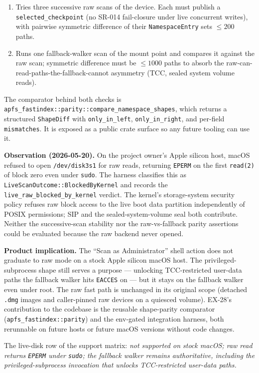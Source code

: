 \begin{enumerate}
  \item Tries three successive raw scans of the device. Each
    must publish a \texttt{selected\_checkpoint} (no SR-014
    fail-closure under live concurrent writes), with pairwise
    symmetric difference of their \texttt{NamespaceEntry} sets
    $\leq 200$ paths.
  \item Runs one fallback-walker scan of the mount point and
    compares it against the raw scan; symmetric difference must
    be $\leq 1000$ paths to absorb the
    raw-can-read-paths-the-fallback-cannot asymmetry (TCC, sealed
    system volume reads).
\end{enumerate}

The comparator behind both checks is
\texttt{apfs\_fastindex::parity::compare\_namespace\_shapes},
which returns a structured \texttt{ShapeDiff} with
\texttt{only\_in\_left}, \texttt{only\_in\_right}, and per-field
\texttt{mismatches}. It is exposed as a public crate surface so
any future tooling can use it.

\textbf{Observation (2026-05-20).} On the project owner's Apple
silicon host, macOS refused to open \texttt{/dev/disk3s1} for raw
reads, returning \texttt{EPERM} on the first \texttt{read(2)} of
block zero even under \texttt{sudo}. The harness classifies this
as \texttt{LiveScanOutcome::BlockedByKernel} and records the
\texttt{live\_raw\_blocked\_by\_kernel} verdict. The kernel's
storage-system security policy refuses raw block access to the
live boot data partition independently of POSIX permissions; SIP
and the sealed-system-volume seal both contribute. Neither the
successive-scan stability nor the raw-vs-fallback parity
assertions could be evaluated because the raw backend never
opened.

\textbf{Product implication.} The ``Scan as Administrator''
shell action does not graduate to raw mode on a stock Apple
silicon macOS host. The privileged-subprocess shape still serves
a purpose --- unlocking TCC-restricted user-data paths the
fallback walker hits \texttt{EACCES} on --- but it stays on the
fallback walker even under root. The raw fast path is unchanged
in its original scope (detached \texttt{.dmg} images and
caller-pinned raw devices on a quiesced volume). EX-28's
contribution to the codebase is the reusable shape-parity
comparator (\texttt{apfs\_fastindex::parity}) and the env-gated
integration harness, both rerunnable on future hosts or future
macOS versions without code changes.

The live-disk row of the support matrix: \emph{not supported on
stock macOS; raw read returns \texttt{EPERM} under \texttt{sudo};
the fallback walker remains authoritative, including the
privileged-subprocess invocation that unlocks TCC-restricted
user-data paths.}

